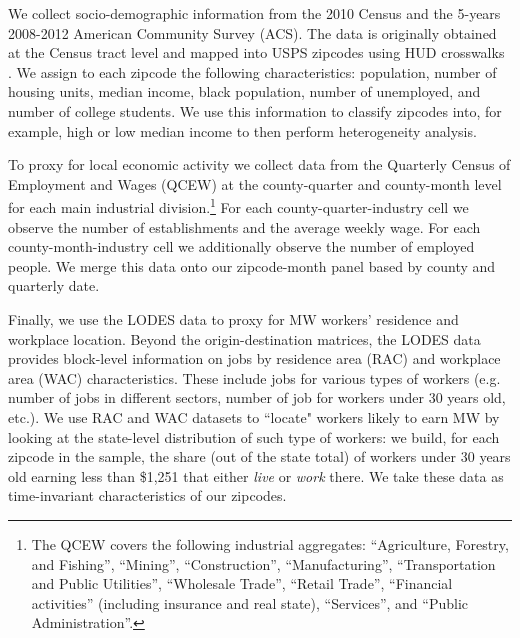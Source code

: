 We collect socio-demographic information from the 2010 Census and the 5-years 2008-2012 
American Community Survey (ACS). The data is originally obtained at the Census tract 
level and mapped into USPS zipcodes using HUD crosswalks \parencite{hudCrosswalks}. We 
assign to each zipcode the following characteristics: population, number of housing units, 
median income, black population, number of unemployed, and number of college students. We 
use this information to classify zipcodes into, for example, high or low median income to 
then perform heterogeneity analysis.

To proxy for local economic activity we collect data from the Quarterly Census of 
Employment and Wages (QCEW) at the county-quarter and county-month level for each main 
industrial division.\footnote{The QCEW covers the following industrial aggregates: 
	``Agriculture, Forestry, and Fishing'', ``Mining'', ``Construction'', ``Manufacturing'', 
	``Transportation and Public Utilities'', ``Wholesale Trade'', ``Retail Trade'',
	``Financial activities'' (including insurance and real state), ``Services'', and 
	``Public Administration''.}
For each county-quarter-industry cell we observe the number of establishments and the 
average weekly wage. For each county-month-industry cell we additionally observe the number 
of employed people. We merge this data onto our zipcode-month panel based by county and 
quarterly date.


Finally, we use the LODES data to proxy for MW workers' residence and workplace location. 
Beyond the origin-destination matrices, the LODES data provides block-level information on 
jobs by residence area (RAC) and workplace area (WAC) characteristics. These include jobs 
for various types of workers (e.g. number of jobs in different sectors, number of job for 
workers under 30 years old, etc.). We use RAC and WAC datasets to ``locate" workers likely 
to earn MW by looking at the state-level distribution of such type of workers: we build, for 
each zipcode in the sample, the share (out of the state total) of workers under 30 years 
old earning less than \$1,251 %
that either \textit{live} or \textit{work} there. We take 
these data as time-invariant characteristics of our zipcodes.

